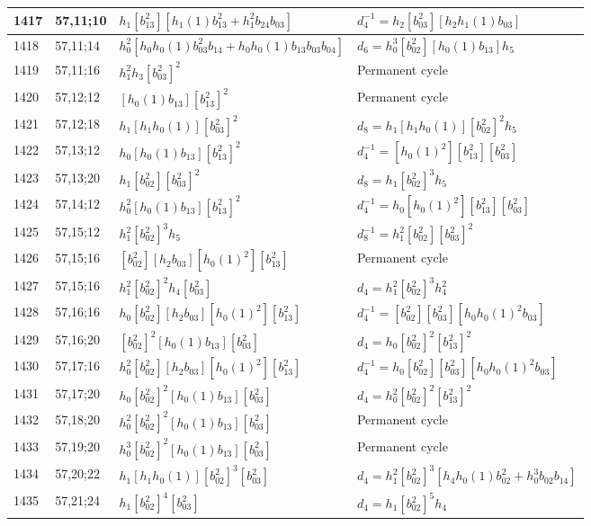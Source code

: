 \documentclass{article}
\begin{document}
\begin{longtable}{|l|l|>{\raggedright\arraybackslash}p{6cm}|>{\raggedright\arraybackslash}p{6cm}|}
\hline
1417 & 57,11;10 & $h_1[b_{13}^2][h_1(1)b_{13}^2 + h_1^2b_{24}b_{03}]$ & $d_{4}^{-1}=h_2[b_{03}^2][h_2h_1(1)b_{03}]$\\
\hline
1418 & 57,11;14 & $h_0^2[h_0h_0(1)b_{03}^2b_{14} + h_0h_0(1)b_{13}b_{03}b_{04}]$ &$d_{6}=h_0^3[b_{02}^2][h_0(1)b_{13}]h_5$\\
\hline
1419 & 57,11;16 & $h_1^2h_3[b_{03}^2]^2$ & Permanent cycle\\
\hline
1420 & 57,12;12 & $[h_0(1)b_{13}][b_{13}^2]^2$ & Permanent cycle\\
\hline
1421 & 57,12;18 & $h_1[h_1h_0(1)][b_{03}^2]^2$ &$d_{8}=h_1[h_1h_0(1)][b_{02}^2]^2h_5$\\
\hline
1422 & 57,13;12 & $h_0[h_0(1)b_{13}][b_{13}^2]^2$ & $d_{4}^{-1}=[h_0(1)^2][b_{13}^2][b_{03}^2]$\\
\hline
1423 & 57,13;20 & $h_1[b_{02}^2][b_{03}^2]^2$ &$d_{8}=h_1[b_{02}^2]^3h_5$\\
\hline
1424 & 57,14;12 & $h_0^2[h_0(1)b_{13}][b_{13}^2]^2$ & $d_{4}^{-1}=h_0[h_0(1)^2][b_{13}^2][b_{03}^2]$\\
\hline
1425 & 57,15;12 & $h_1^2[b_{02}^2]^3h_5$ & $d_{8}^{-1}=h_1^2[b_{02}^2][b_{03}^2]^2$\\
\hline
1426 & 57,15;16 & $[b_{02}^2][h_2b_{03}][h_0(1)^2][b_{13}^2]$ & Permanent cycle\\
1427 & 57,15;16 & $h_1^2[b_{02}^2]^2h_4[b_{03}^2]$ &$d_{4}=h_1^2[b_{02}^2]^3h_4^2$\\
\hline
1428 & 57,16;16 & $h_0[b_{02}^2][h_2b_{03}][h_0(1)^2][b_{13}^2]$ & $d_{4}^{-1}=[b_{02}^2][b_{03}^2][h_0h_0(1)^2b_{03}]$\\
\hline
1429 & 57,16;20 & $[b_{02}^2]^2[h_0(1)b_{13}][b_{03}^2]$ &$d_{4}=h_0[b_{02}^2]^2[b_{13}^2]^2$\\
\hline
1430 & 57,17;16 & $h_0^2[b_{02}^2][h_2b_{03}][h_0(1)^2][b_{13}^2]$ & $d_{4}^{-1}=h_0[b_{02}^2][b_{03}^2][h_0h_0(1)^2b_{03}]$\\
\hline
1431 & 57,17;20 & $h_0[b_{02}^2]^2[h_0(1)b_{13}][b_{03}^2]$ &$d_{4}=h_0^2[b_{02}^2]^2[b_{13}^2]^2$\\
\hline
1432 & 57,18;20 & $h_0^2[b_{02}^2]^2[h_0(1)b_{13}][b_{03}^2]$ & Permanent cycle\\
\hline
1433 & 57,19;20 & $h_0^3[b_{02}^2]^2[h_0(1)b_{13}][b_{03}^2]$ & Permanent cycle\\
\hline
1434 & 57,20;22 & $h_1[h_1h_0(1)][b_{02}^2]^3[b_{03}^2]$ &$d_{4}=h_1^2[b_{02}^2]^3[h_4h_0(1)b_{02}^2 + h_0^3b_{02}b_{14}]$\\
\hline
1435 & 57,21;24 & $h_1[b_{02}^2]^4[b_{03}^2]$ &$d_{4}=h_1[b_{02}^2]^5h_4$\\

\end{longtable}
\end{document}

